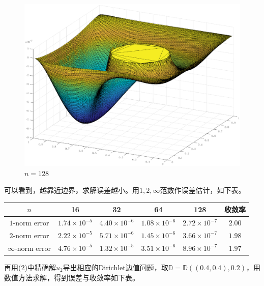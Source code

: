 \documentclass[lang=cn,11pt,a4paper]{elegantpaper}
\begin{document}
\begin{figure}[htbp]
\begin{minipage}[t]{0.24\linewidth}
    \caption*{$n=64$}
  \end{minipage}
  \begin{minipage}[t]{0.24\linewidth}
    \centering
    \includegraphics[width=0.95\linewidth]{figure/error_problem1_D_ir_n=128.eps}
    \caption*{$n=128$}
  \end{minipage}
\end{figure}

可以看到，越靠近边界，求解误差越小。用$1,2,\infty$范数作误差估计，如下表。

\begin{table}[H]
  \centering
  \begin{tabular}{c|cccc|c}
  \textbf{$n$}        & 16                   & 32                   & 64                   & 128                  & 收敛率 \\ \hline
  $1$-norm error      & $1.74\times 10^{-5}$ & $4.40\times 10^{-6}$ & $1.08\times 10^{-6}$ & $2.72\times 10^{-7}$ & $2.00$\\
  $2$-norm error      & $2.22\times 10^{-5}$ & $5.71\times 10^{-6}$ & $1.45\times 10^{-6}$ & $3.66\times 10^{-7}$ & $1.98$\\
  $\infty$-norm error & $4.76\times 10^{-5}$ & $1.32\times 10^{-5}$ & $3.51\times 10^{-6}$ & $8.96\times 10^{-7}$ & $1.97$
  \end{tabular}
\end{table}

再用(2)中精确解$u_2$导出相应的Dirichlet边值问题，取$\mathbb{D}=\mathbb{D}((0.4,0.4),0.2)$，用数值方法求解，得到误差与收敛率如下表。
\end{document}
